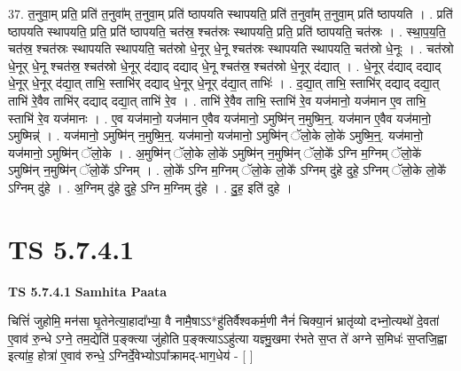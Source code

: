\documentclass[17pt]{extarticle}
\begin{document}
37. त॒नुवा॒म् प्रति॒ प्रति॑ त॒नुवा᳚म् त॒नुवा॒म् प्रति॑ ष्ठापयति स्थापयति॒ प्रति॑ त॒नुवा᳚म् त॒नुवा॒म् प्रति॑ ष्ठापयति । . प्रति॑ ष्ठापयति स्थापयति॒ प्रति॒ प्रति॑ ष्ठापयति॒ चत॑स्र॒ श्चत॑स्रः स्थापयति॒ प्रति॒ प्रति॑ ष्ठापयति॒ चत॑स्रः । . स्था॒प॒य॒ति॒ चत॑स्र॒ श्चत॑स्रः स्थापयति स्थापयति॒ चत॑स्रो धे॒नूर् धे॒नू श्चत॑स्रः स्थापयति स्थापयति॒ चत॑स्रो धे॒नूः । . चत॑स्रो धे॒नूर् धे॒नू श्चत॑स्र॒ श्चत॑स्रो धे॒नूर् द॑द्याद् दद्याद् धे॒नू श्चत॑स्र॒ श्चत॑स्रो धे॒नूर् द॑द्यात् । . धे॒नूर् द॑द्याद् दद्याद् धे॒नूर् धे॒नूर् द॑द्या॒त् ताभि॒ स्ताभि॑र् दद्याद् धे॒नूर् धे॒नूर् द॑द्या॒त् ताभिः॑ । . द॒द्या॒त् ताभि॒ स्ताभि॑र् दद्याद् दद्या॒त् ताभि॑ रे॒वैव ताभि॑र् दद्याद् दद्या॒त् ताभि॑ रे॒व । . ताभि॑ रे॒वैव ताभि॒ स्ताभि॑ रे॒व यज॑मानो॒ यज॑मान ए॒व ताभि॒ स्ताभि॑ रे॒व यज॑मानः । . ए॒व यज॑मानो॒ यज॑मान ए॒वैव यज॑मानो॒ ऽमुष्मि॑न् न॒मुष्मि॒न्॒. यज॑मान ए॒वैव यज॑मानो॒ ऽमुष्मिन्न्॑ । . यज॑मानो॒ ऽमुष्मि॑न् न॒मुष्मि॒न्॒. यज॑मानो॒ यज॑मानो॒ ऽमुष्मि॑न् ॅलो॒के लो॒के॑ ऽमुष्मि॒न्॒. यज॑मानो॒ यज॑मानो॒ ऽमुष्मि॑न् ॅलो॒के । . अ॒मुष्मि॑न् ॅलो॒के लो॒के॑ ऽमुष्मि॑न् न॒मुष्मि॑न् ॅलो॒के᳚ ऽग्नि म॒ग्निम् ॅलो॒के॑ ऽमुष्मि॑न् न॒मुष्मि॑न् ॅलो॒के᳚ ऽग्निम् । . लो॒के᳚ ऽग्नि म॒ग्निम् ॅलो॒के लो॒के᳚ ऽग्निम् दु॑हे दुहे॒ ऽग्निम् ॅलो॒के लो॒के᳚ ऽग्निम् दु॑हे । . अ॒ग्निम् दु॑हे दुहे॒ ऽग्नि म॒ग्निम् दु॑हे । . दु॒ह॒ इति॑ दुहे । \newline
\pagebreak
{}

\section{ TS 5.7.4.1 }

\textbf{TS 5.7.4.1 } \newline
\textbf{Samhita Paata} \newline

चित्तिं॑ जुहोमि॒ मन॑सा घृ॒तेनेत्या॒हादा᳚भ्या॒ वै नामै॒षाऽऽ*हु॑तिर्वैश्वकर्म॒णी नैनं॑ चिक्या॒नं भ्रातृ॑व्यो दभ्नो॒त्यथो॑ दे॒वता॑ ए॒वाव॑ रु॒न्धे ऽग्ने॒ तम॒द्येति॑ प॒ङ्क्त्या जु॑होति प॒ङ्क्त्याऽऽहु॑त्या यज्ञ्मु॒खमा र॑भते स॒प्त ते॑ अग्ने स॒मिधः॑ स॒प्तजि॒ह्वा इत्या॑ह॒ होत्रा॑ ए॒वाव॑ रुन्धे॒ ऽग्निर्दे॒वेभ्योऽपा᳚क्रामद्-भाग॒धेय॑ - [  ] \newline
\end{document}
